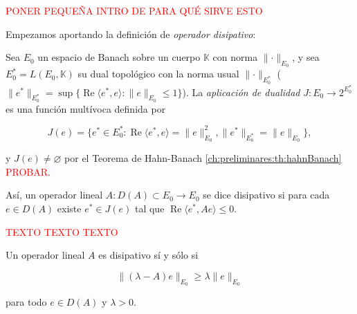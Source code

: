 \textcolor{red}{PONER PEQUEÑA INTRO DE PARA QUÉ SIRVE ESTO}

Empezamos aportando la definición de \textit{operador disipativo}:\\

\begin{Definicion}
    \label{ch:semigrupos:def:OpDisipativo}
    Sea $E_0$ un espacio de Banach sobre un cuerpo $\mathbb{K}$ con norma $\lVert \cdot \rVert_{E_0}$, y sea $E^*_0 = L(E_0, \mathbb{K})$ su dual topológico con la norma usual $\lVert \cdot \rVert_{E^*_0}$ ($\lVert e^* \rVert_{E^*_0} = \sup \{\operatorname{Re}\langle e^*, e \rangle : \lVert e \rVert_{E_0} \leq 1 \}$). La \textit{aplicación de dualidad} $J : E_0 \rightarrow 2^{E^*_0}$ es una función multívoca definida por

    \[J(e) = \{e^* \in E_0^* : \operatorname{Re}\langle e^*, e \rangle = \lVert e \rVert^2_{E_0}, \lVert e^* \rVert_{E_0^*} = \lVert e \rVert_{E_0}\},\]

    y $J(e) \neq \varnothing$ por el Teorema de Hahn-Banach \ref{ch:preliminares:th:hahnBanach} \textcolor{red}{PROBAR}.

    Así, un operador lineal $A : D(A) \subset E_0 \rightarrow E_0$ se dice disipativo si para cada $e \in D(A)$ existe $e^* \in J(e)$ tal que $\operatorname{Re}\langle e^*, Ae \rangle \leq 0$.\\
\end{Definicion}

\textcolor{red}{TEXTO TEXTO TEXTO}\\

\begin{Lema}
    \label{ch:semigrupos:lemma:CondOpDisipativo}
    \leavevmode\par
    Un operador lineal $A$ es disipativo sí y sólo si

    \[\lVert (\lambda - A)e\rVert_{E_0} \geq \lambda \lVert e \rVert_{E_0}\]

    para todo $e \in D(A)$ y $\lambda > 0$.
\end{Lema}


